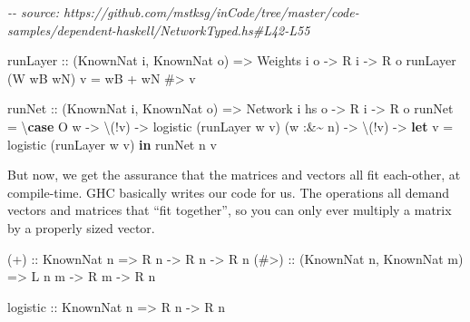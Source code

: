 \documentclass[]{article}
\newenvironment{Shaded}{}{}
\newcommand{\CommentTok}[1]{\textcolor[rgb]{0.38,0.63,0.69}{\textit{#1}}}
\newcommand{\DataTypeTok}[1]{\textcolor[rgb]{0.56,0.13,0.00}{#1}}
\newcommand{\KeywordTok}[1]{\textcolor[rgb]{0.00,0.44,0.13}{\textbf{#1}}}
\newcommand{\NormalTok}[1]{#1}
\newcommand{\OperatorTok}[1]{\textcolor[rgb]{0.40,0.40,0.40}{#1}}
\newcommand{\OtherTok}[1]{\textcolor[rgb]{0.00,0.44,0.13}{#1}}
\begin{document}
\begin{Shaded}
\begin{Highlighting}[]
\CommentTok{{-}{-} source: https://github.com/mstksg/inCode/tree/master/code{-}samples/dependent{-}haskell/NetworkTyped.hs\#L42{-}L55}

\OtherTok{runLayer ::}\NormalTok{ (}\DataTypeTok{KnownNat}\NormalTok{ i, }\DataTypeTok{KnownNat}\NormalTok{ o)}
         \OtherTok{=>} \DataTypeTok{Weights}\NormalTok{ i o}
         \OtherTok{{-}>} \DataTypeTok{R}\NormalTok{ i}
         \OtherTok{{-}>} \DataTypeTok{R}\NormalTok{ o}
\NormalTok{runLayer (}\DataTypeTok{W}\NormalTok{ wB wN) v }\OtherTok{=}\NormalTok{ wB }\OperatorTok{+}\NormalTok{ wN }\OperatorTok{\#>}\NormalTok{ v}

\OtherTok{runNet ::}\NormalTok{ (}\DataTypeTok{KnownNat}\NormalTok{ i, }\DataTypeTok{KnownNat}\NormalTok{ o)}
       \OtherTok{=>} \DataTypeTok{Network}\NormalTok{ i hs o}
       \OtherTok{{-}>} \DataTypeTok{R}\NormalTok{ i}
       \OtherTok{{-}>} \DataTypeTok{R}\NormalTok{ o}
\NormalTok{runNet }\OtherTok{=}\NormalTok{ \textbackslash{}}\KeywordTok{case}
   \DataTypeTok{O}\NormalTok{ w }\OtherTok{{-}>}\NormalTok{ \textbackslash{}(}\OperatorTok{!}\NormalTok{v) }\OtherTok{{-}>}\NormalTok{ logistic (runLayer w v)}
\NormalTok{   (w }\OperatorTok{:\&\textasciitilde{}}\NormalTok{ n\textquotesingle{}) }\OtherTok{{-}>}\NormalTok{ \textbackslash{}(}\OperatorTok{!}\NormalTok{v) }\OtherTok{{-}>} \KeywordTok{let}\NormalTok{ v\textquotesingle{} }\OtherTok{=}\NormalTok{ logistic (runLayer w v)}
                          \KeywordTok{in}\NormalTok{ runNet n\textquotesingle{} v\textquotesingle{}}
\end{Highlighting}
\end{Shaded}

But now, we get the assurance that the matrices and vectors all fit each-other,
at compile-time. GHC basically writes our code for us. The operations all demand
vectors and matrices that ``fit together'', so you can only ever multiply a
matrix by a properly sized vector.

\begin{Shaded}
\begin{Highlighting}[]
\OtherTok{(+)  ::} \DataTypeTok{KnownNat}\NormalTok{ n}
     \OtherTok{=>} \DataTypeTok{R}\NormalTok{ n }\OtherTok{{-}>} \DataTypeTok{R}\NormalTok{ n }\OtherTok{{-}>} \DataTypeTok{R}\NormalTok{ n}
\OtherTok{(\#>) ::}\NormalTok{ (}\DataTypeTok{KnownNat}\NormalTok{ n, }\DataTypeTok{KnownNat}\NormalTok{ m)}
     \OtherTok{=>} \DataTypeTok{L}\NormalTok{ n m }\OtherTok{{-}>} \DataTypeTok{R}\NormalTok{ m }\OtherTok{{-}>} \DataTypeTok{R}\NormalTok{ n}

\OtherTok{logistic ::} \DataTypeTok{KnownNat}\NormalTok{ n}
         \OtherTok{=>} \DataTypeTok{R}\NormalTok{ n }\OtherTok{{-}>} \DataTypeTok{R}\NormalTok{ n}
\end{Highlighting}
\end{Shaded}
\end{document}
